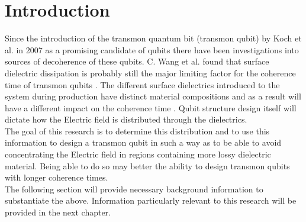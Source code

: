 \chapter{Introduction}
Since the introduction of the transmon quantum bit (transmon qubit) by Koch et al. in 2007 \cite{Koch2007} as a promising candidate of qubits there have been investigations into sources of decoherence of these qubits. C. Wang et al. found that surface dielectric dissipation is probably still the major limiting factor for the coherence time of transmon qubits \cite{Wang2015}. The different surface dielectrics introduced to the system during production have distinct material compositions \cite{Bruno2015} and as a result will have a different impact on the coherence time \cite{Wang2015}. Qubit structure design itself will dictate how the Electric field is distributed through the dielectrics. \\The goal of this research is to determine this distribution and to use this information to design a transmon qubit in such a way as to be able to avoid concentrating the Electric field in regions containing more lossy dielectric material. Being able to do so may better the ability to design transmon qubits with longer coherence times. \\ The following section will provide necessary background information to substantiate the above. Information particularly relevant to this research will be provided in the next chapter.

